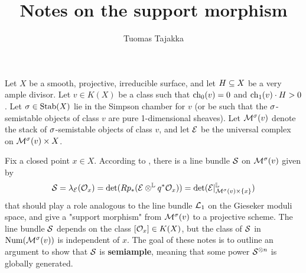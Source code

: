\documentclass[letterpaper,10pt]{article}
\title{Notes on the support morphism}
\author{Tuomas Tajakka}
\date{}
\theoremstyle{remark}
\begin{document}
\maketitle

Let $X$ be a smooth, projective, irreducible surface, and let $H \subseteq X$ be a very ample divisor. Let $v \in K(X)$ be a class such that $\operatorname{\mathrm{ch}}_0(v) = 0$ and $\operatorname{\mathrm{ch}}_1(v) \cdot H > 0$. Let $\sigma \in \operatorname{\mathrm{Stab}}(X)$ lie in the Simpson chamber for $v$ (or be such that the $\sigma$-semistable objects of class $v$ are pure 1-dimensional sheaves). Let $\mathcal{M}^\sigma(v)$ denote the stack of $\sigma$-semistable objects of class $v$, and let $\mathcal{E}$ be the universal complex on $\mathcal{M}^\sigma(v) \times X$.
\begin{center}
\end{center}
Fix a closed point $x \in X$. According to \cite[Conjecture 4.6.3]{liuwanmin}, there is a line bundle $\mathcal{S}$ on $\mathcal{M}^\sigma(v)$ given by 
\[ \mathcal{S} = \lambda_{\mathcal{E}}(\mathcal{O}_x) = \det(R p_*(\mathcal{E} \otimes^{\mathbb{L}} q^* \mathcal{O}_x)) = \det(\mathcal{E}|^{\mathbb{L}}_{\mathcal{M}^\sigma(v) \times \{x\}}) \]
that should play a role analogous to the line bundle $\mathcal{L}_1$ on the Gieseker moduli space, and give a "support morphism" from $\mathcal{M}^\sigma(v)$ to a projective scheme. The line bundle $\mathcal{S}$ depends on the class $[\mathcal{O}_x] \in K(X)$, but the class of $\mathcal{S}$ in $\mathrm{Num}(\mathcal{M}^\sigma(v))$ is independent of $x$. The goal of these notes is to outline an argument to show that $\mathcal{S}$ is \textbf{semiample}, meaning that some power $\mathcal{S}^{\otimes n}$ is globally generated.
\end{document}
